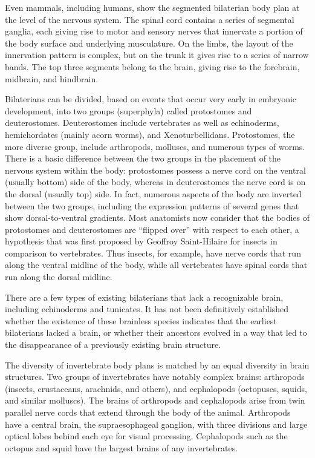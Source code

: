 \documentclass[]{book}
\begin{document}
Even mammals, including humans, show the segmented bilaterian body plan at the level of the nervous system. The spinal cord contains a series of segmental ganglia, each giving rise to motor and sensory nerves that innervate a portion of the body surface and underlying musculature. On the limbs, the layout of the innervation pattern is complex, but on the trunk it gives rise to a series of narrow bands. The top three segments belong to the brain, giving rise to the forebrain, midbrain, and hindbrain.

Bilaterians can be divided, based on events that occur very early in embryonic development, into two groups (superphyla) called protostomes and deuterostomes. Deuterostomes include vertebrates as well as echinoderms, hemichordates (mainly acorn worms), and Xenoturbellidans. Protostomes, the more diverse group, include arthropods, molluscs, and numerous types of worms. There is a basic difference between the two groups in the placement of the nervous system within the body: protostomes possess a nerve cord on the ventral (usually bottom) side of the body, whereas in deuterostomes the nerve cord is on the dorsal (usually top) side. In fact, numerous aspects of the body are inverted between the two groups, including the expression patterns of several genes that show dorsal-to-ventral gradients. Most anatomists now consider that the bodies of protostomes and deuterostomes are ``flipped over'' with respect to each other, a hypothesis that was first proposed by Geoffroy Saint-Hilaire for insects in comparison to vertebrates. Thus insects, for example, have nerve cords that run along the ventral midline of the body, while all vertebrates have spinal cords that run along the dorsal midline.

There are a few types of existing bilaterians that lack a recognizable brain, including echinoderms and tunicates. It has not been definitively established whether the existence of these brainless species indicates that the earliest bilaterians lacked a brain, or whether their ancestors evolved in a way that led to the disappearance of a previously existing brain structure.

The diversity of invertebrate body plans is matched by an equal diversity in brain structures. Two groups of invertebrates have notably complex brains: arthropods (insects, crustaceans, arachnids, and others), and cephalopods (octopuses, squids, and similar molluscs). The brains of arthropods and cephalopods arise from twin parallel nerve cords that extend through the body of the animal. Arthropods have a central brain, the supraesophageal ganglion, with three divisions and large optical lobes behind each eye for visual processing. Cephalopods such as the octopus and squid have the largest brains of any invertebrates.
\end{document}
